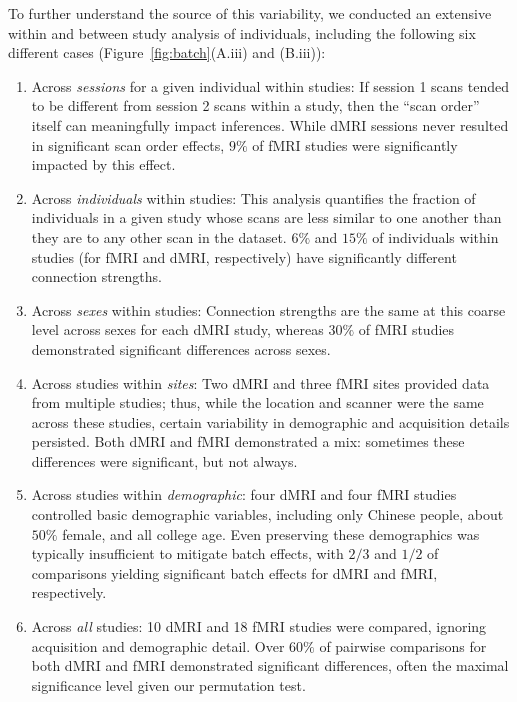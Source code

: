 \documentclass[11pt]{article}
\begin{document}
\begin{multicols}{2}
To further understand the source of this variability, we conducted an extensive within and between study analysis of individuals, including the following six different cases (Figure~\ref{fig:batch}(A.iii) and (B.iii)):
\begin{enumerate}[wide, labelwidth=!, labelindent=0pt, label=\bf{\arabic*)}]
        \item  Across \emph{sessions} for a given individual within studies:  If  session 1  scans tended to be different from session 2 scans within a study, then the ``scan order'' itself can meaningfully impact inferences. While dMRI sessions never resulted in significant scan order effects, $9\%$ of fMRI studies were significantly impacted by this effect.   
        \item Across \emph{individuals} within studies: This analysis quantifies the fraction of individuals in a given study whose scans are less similar to one another than they are to any other scan in the dataset. $6\%$ and $15\%$ of individuals within studies (for fMRI and dMRI, respectively) have significantly different connection strengths.
        \item Across \emph{sexes} within studies: Connection strengths are the same at this coarse level across sexes for each dMRI study, whereas $30\%$ of fMRI studies demonstrated significant differences across sexes.
        \item Across studies within \emph{sites}: Two dMRI and three fMRI sites provided data from multiple studies; thus, while the location and scanner were the same across these studies, certain variability in demographic and acquisition details persisted. Both dMRI and fMRI demonstrated a mix: sometimes these differences were significant, but not always. 
        \item Across studies within \emph{demographic}: four dMRI and four fMRI studies controlled basic demographic variables,  including only Chinese people, about $50\%$ female, and all college age. Even preserving these demographics was typically insufficient to mitigate batch effects, with $2/3$ and $1/2$ of comparisons yielding significant batch effects for dMRI and fMRI, respectively.
        \item Across \emph{all} studies: 10 dMRI and 18 fMRI studies were compared, ignoring acquisition and demographic detail. Over $60\%$ of pairwise comparisons for both dMRI and fMRI demonstrated significant differences, often the maximal significance level given our permutation test.
\end{enumerate} 


\end{multicols}
\end{document}
